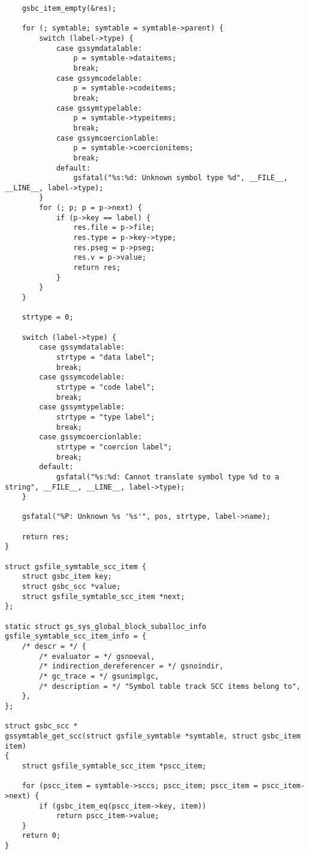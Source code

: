 \documentclass{report}
\begin{document}
\begin{verbatim}
    gsbc_item_empty(&res);

    for (; symtable; symtable = symtable->parent) {
        switch (label->type) {
            case gssymdatalable:
                p = symtable->dataitems;
                break;
            case gssymcodelable:
                p = symtable->codeitems;
                break;
            case gssymtypelable:
                p = symtable->typeitems;
                break;
            case gssymcoercionlable:
                p = symtable->coercionitems;
                break;
            default:
                gsfatal("%s:%d: Unknown symbol type %d", __FILE__, __LINE__, label->type);
        }
        for (; p; p = p->next) {
            if (p->key == label) {
                res.file = p->file;
                res.type = p->key->type;
                res.pseg = p->pseg;
                res.v = p->value;
                return res;
            }
        }
    }

    strtype = 0;

    switch (label->type) {
        case gssymdatalable:
            strtype = "data label";
            break;
        case gssymcodelable:
            strtype = "code label";
            break;
        case gssymtypelable:
            strtype = "type label";
            break;
        case gssymcoercionlable:
            strtype = "coercion label";
            break;
        default:
            gsfatal("%s:%d: Cannot translate symbol type %d to a string", __FILE__, __LINE__, label->type);
    }

    gsfatal("%P: Unknown %s '%s'", pos, strtype, label->name);

    return res;
}

struct gsfile_symtable_scc_item {
    struct gsbc_item key;
    struct gsbc_scc *value;
    struct gsfile_symtable_scc_item *next;
};

static struct gs_sys_global_block_suballoc_info gsfile_symtable_scc_item_info = {
    /* descr = */ {
        /* evaluator = */ gsnoeval,
        /* indirection_dereferencer = */ gsnoindir,
        /* gc_trace = */ gsunimplgc,
        /* description = */ "Symbol table track SCC items belong to",
    },
};

struct gsbc_scc *
gssymtable_get_scc(struct gsfile_symtable *symtable, struct gsbc_item item)
{
    struct gsfile_symtable_scc_item *pscc_item;

    for (pscc_item = symtable->sccs; pscc_item; pscc_item = pscc_item->next) {
        if (gsbc_item_eq(pscc_item->key, item))
            return pscc_item->value;
    }
    return 0;
}


\end{verbatim}
\end{document}
